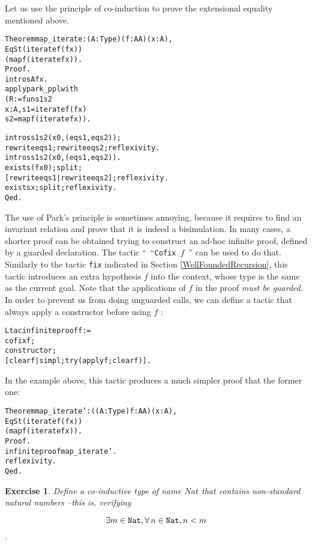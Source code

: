 \documentclass[11pt]{article}
\newcommand{\refmancite}[1]{{}}
\newtheorem{exercise}{Exercise}[section]
\begin{document}
Let us use the principle of co-induction to prove the extensional
equality mentioned above. 
\begin{alltt}
Theorem map_iterate : {\prodsym} (A:Type)(f:A{\arrow}A)(x:A),
                       EqSt (iterate f (f x)) 
                            (map f (iterate f x)).
Proof.
 intros A f x.
 apply park_ppl with
   (R:= fun s1 s2 {\funarrow}
       {\exsym} x: A, s1 = iterate f (f x) {\coqand} 
                s2 = map f (iterate f x)).

 intros s1 s2 (x0,(eqs1,eqs2));
    rewrite eqs1; rewrite eqs2; reflexivity.
 intros s1 s2 (x0,(eqs1,eqs2)).
 exists (f x0);split;
    [rewrite eqs1|rewrite eqs2]; reflexivity.
 exists x;split; reflexivity.
Qed.
\end{alltt}

The use of Park's principle is sometimes annoying, because it requires
to find an invariant relation and prove that it is indeed a
bisimulation.  In many cases, a shorter proof can be obtained trying
to construct an ad-hoc infinite proof, defined by a guarded
declaration.  The tactic ``~``\texttt{Cofix $f$}~'' can be used to do
that. Similarly to the tactic \texttt{fix} indicated in Section
\ref{WellFoundedRecursion}, this tactic introduces an extra hypothesis
$f$ into the context, whose type is the same as the current goal. Note
that the applications of $f$ in the proof \textsl{must be guarded}. In
order to prevent us from doing unguarded calls, we can define a tactic
that always apply a constructor before using $f$ \refmancite{Chapter
\ref{WritingTactics}} :

\begin{alltt}
Ltac infiniteproof f :=
  cofix f; 
  constructor; 
  [clear f| simpl; try (apply f; clear f)].
\end{alltt}


In the example above, this tactic produces a much simpler proof
that the former one:

\begin{alltt}
Theorem map_iterate' : {\prodsym} ((A:Type)f:A{\arrow}A)(x:A),
                       EqSt (iterate f (f x))
                            (map f (iterate f x)).
Proof.
 infiniteproof map_iterate'.
 reflexivity.
Qed.
\end{alltt}

\begin{exercise}
Define a co-inductive type of name $Nat$ that contains non-standard 
natural numbers --this is, verifying 

$$\exists m  \in \mbox{\texttt{Nat}}, \forall\, n \in \mbox{\texttt{Nat}}, n<m$$.
\end{exercise}
\end{document}
